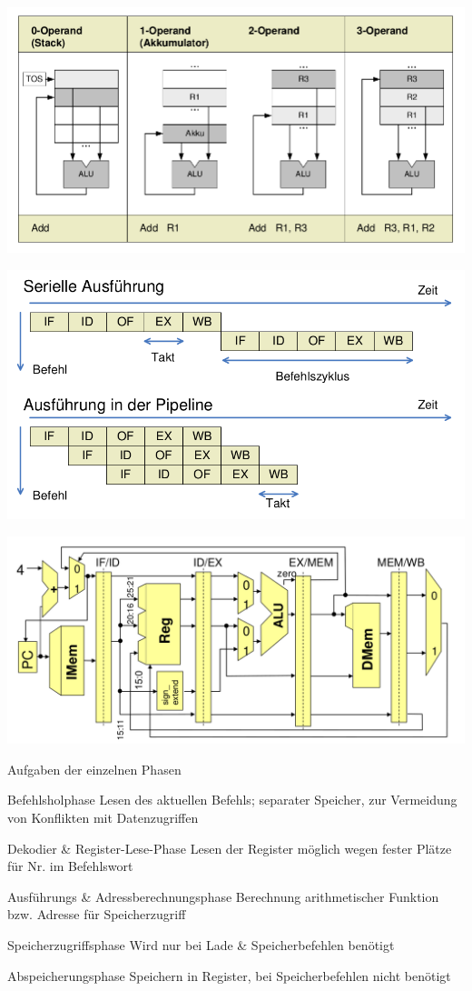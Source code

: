 \documentclass[10pt,landscape]{article}
\begin{document}
\begin{multicols}{3}
  \includegraphics[width=\textwidth/4]{Assets/RA2_Operanden.png}
  
  \includegraphics[width=\textwidth/4]{Assets/RA2_pipelineCPU.png}
  
  \includegraphics[width=\textwidth/4]{Assets/RA2_mehrzyklenCPU.png}
  
  Aufgaben der einzelnen Phasen
  \begin{description*}
    \item[Befehlsholphase] Lesen des aktuellen Befehls; separater Speicher, zur Vermeidung von Konflikten mit Datenzugriffen
    \item[Dekodier \& Register-Lese-Phase] Lesen der Register möglich wegen fester Plätze für Nr. im Befehlswort
    \item[Ausführungs \& Adressberechnungsphase] Berechnung arithmetischer Funktion bzw. Adresse für Speicherzugriff
    \item[Speicherzugriffsphase] Wird nur bei Lade \& Speicherbefehlen benötigt
    \item[Abspeicherungsphase] Speichern in Register, bei Speicherbefehlen nicht benötigt
  \end{description*}
  

\end{multicols}
\end{document}
